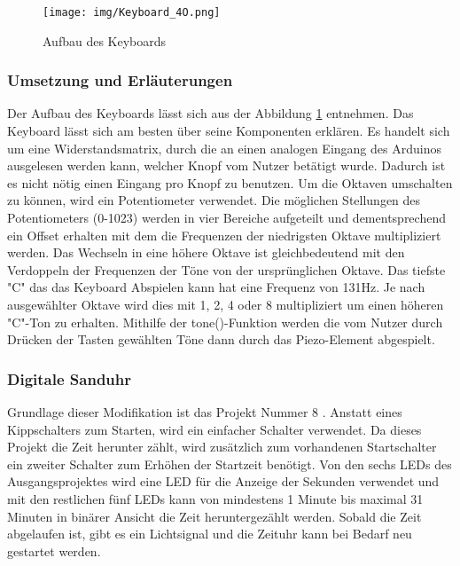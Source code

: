 \begin{figure}[h]
\begin{center}
\texttt{[image: img/Keyboard\_4O.png]}
\caption{Aufbau des Keyboards}
\label{kb_aufbau}
\end{center}
\end{figure}

\subsubsection{Umsetzung und Erläuterungen}
Der Aufbau des Keyboards lässt sich aus der Abbildung \ref{kb_aufbau} entnehmen.
Das Keyboard lässt sich am besten über seine Komponenten erklären.
Es handelt sich um eine Widerstandsmatrix, durch die an einen analogen Eingang des Arduinos ausgelesen werden kann,
welcher Knopf vom Nutzer betätigt wurde. Dadurch ist es nicht nötig einen Eingang pro Knopf zu benutzen.
Um die Oktaven umschalten zu können, wird ein Potentiometer verwendet.
Die möglichen Stellungen des Potentiometers (0-1023) werden in vier Bereiche aufgeteilt und 
dementsprechend ein Offset erhalten mit dem die Frequenzen der niedrigsten Oktave multipliziert werden.
Das Wechseln in eine höhere Oktave ist gleichbedeutend mit den Verdoppeln der Frequenzen der Töne von der ursprünglichen Oktave.
Das tiefste "C" das das Keyboard Abspielen kann hat eine Frequenz von 131Hz. Je nach ausgewählter Oktave wird dies mit 1, 2, 4 oder 8 multipliziert um einen höheren "C"-Ton zu erhalten.
Mithilfe der tone()-Funktion werden die vom Nutzer durch Drücken der Tasten gewählten Töne dann durch das Piezo-Element abgespielt.




\subsubsection{Digitale Sanduhr}
Grundlage dieser Modifikation ist das Projekt Nummer 8 \autocite{arduino}. Anstatt eines Kippschalters zum Starten, wird ein einfacher Schalter verwendet. Da dieses Projekt die Zeit herunter zählt, wird zusätzlich zum vorhandenen Startschalter ein zweiter Schalter zum Erhöhen der Startzeit benötigt. Von den sechs LEDs des Ausgangsprojektes wird eine LED für die Anzeige der Sekunden verwendet und mit den restlichen fünf LEDs kann von mindestens 1 Minute bis maximal 31 Minuten in binärer Ansicht die Zeit heruntergezählt werden. Sobald die Zeit abgelaufen ist, gibt es ein Lichtsignal und die Zeituhr kann bei Bedarf neu gestartet werden.

